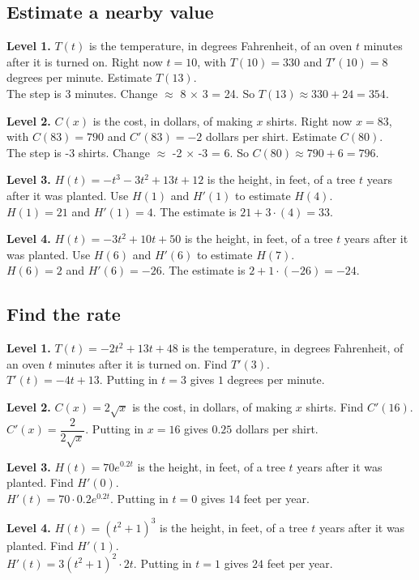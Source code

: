 \documentclass[11pt]{article}
\begin{document}
\subsection*{Estimate a nearby value}
\noindent\textbf{Level 1.} $T(t)$ is the temperature, in degrees Fahrenheit, of an oven $t$ minutes after it is turned on. Right now $t=10$, with $T(10)=330$ and $T'(10)=8$ degrees per minute. Estimate $T(13)$.\\  \quad The step is 3 minutes. Change $\approx$ 8 $\times$ 3 = 24. So $T(13)\approx330+24=354$.\par\medskip
\noindent\textbf{Level 2.} $C(x)$ is the cost, in dollars, of making $x$ shirts. Right now $x=83$, with $C(83)=790$ and $C'(83)=-2$ dollars per shirt. Estimate $C(80)$.\\  \quad The step is -3 shirts. Change $\approx$ -2 $\times$ -3 = 6. So $C(80)\approx790+6=796$.\par\medskip
\noindent\textbf{Level 3.} $H(t)=-t^{3}-3t^{2}+13t+12$ is the height, in feet, of a tree $t$ years after it was planted. Use $H(1)$ and $H'(1)$ to estimate $H(4)$.\\  \quad $H(1)=21$ and $H'(1)=4$. The estimate is $21+3\cdot(4)=33$.\par\medskip
\noindent\textbf{Level 4.} $H(t)=-3t^{2}+10t+50$ is the height, in feet, of a tree $t$ years after it was planted. Use $H(6)$ and $H'(6)$ to estimate $H(7)$.\\  \quad $H(6)=2$ and $H'(6)=-26$. The estimate is $2+1\cdot(-26)=-24$.\par\medskip
\subsection*{Find the rate}
\noindent\textbf{Level 1.} $T(t)=-2t^{2}+13t+48$ is the temperature, in degrees Fahrenheit, of an oven $t$ minutes after it is turned on. Find $T'(3)$.\\  \quad $T'(t)=-4t+13$. Putting in $t=3$ gives $1$ degrees per minute.\par\medskip
\noindent\textbf{Level 2.} $C(x)=2\sqrt{x}$ is the cost, in dollars, of making $x$ shirts. Find $C'(16)$.\\  \quad $C'(x)=\dfrac{2}{2\sqrt{x}}$. Putting in $x=16$ gives $0.25$ dollars per shirt.\par\medskip
\noindent\textbf{Level 3.} $H(t)=70e^{0.2t}$ is the height, in feet, of a tree $t$ years after it was planted. Find $H'(0)$.\\  \quad $H'(t)=70\cdot0.2e^{0.2t}$. Putting in $t=0$ gives $14$ feet per year.\par\medskip
\noindent\textbf{Level 4.} $H(t)=(t^{2}+1)^{3}$ is the height, in feet, of a tree $t$ years after it was planted. Find $H'(1)$.\\  \quad $H'(t)=3(t^2+1)^{2}\cdot2t$. Putting in $t=1$ gives $24$ feet per year.\par\medskip
\end{document}

